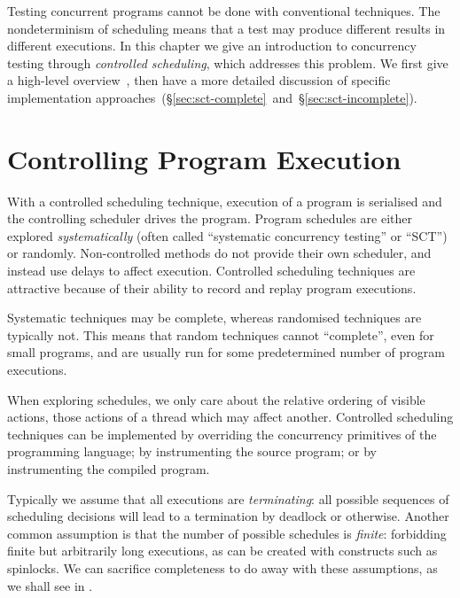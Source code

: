 Testing concurrent programs cannot be done with conventional techniques.  The
nondeterminism of scheduling means that a test may produce different results in
different executions.  In this chapter we give an introduction to concurrency
testing through \emph{controlled scheduling}, which addresses this problem.  We
first give a high-level overview~, then have a more
detailed discussion of specific implementation
approaches~(\S\ref{sec:sct-complete}~and~\S\ref{sec:sct-incomplete}).

\section{Controlling Program Execution}
\label{sec:sct-fundamentals}

With a controlled scheduling technique, execution of a program is serialised and
the controlling scheduler drives the program.  Program schedules are either
explored \emph{systematically}\cite{coons2013,musuvathi2008,musuvathi2007,flanagan2005}
(often called ``systematic concurrency testing'' or ``SCT'') or
randomly\cite{thomson2016,burckhardt2010}.  Non-controlled methods do not
provide their own scheduler, and instead use delays to affect
execution\cite{yu2012}.  Controlled scheduling techniques are attractive because
of their ability to record and replay program executions.

Systematic techniques may be complete, whereas randomised techniques are
typically not.  This means that random techniques cannot ``complete'', even for
small programs, and are usually run for some predetermined number of program
executions.

When exploring schedules, we only care about the relative ordering of visible
actions, those actions of a thread which may affect another.  Controlled
scheduling techniques can be implemented by overriding the concurrency
primitives of the programming language\cite{walker2015}; by instrumenting the
source program\cite{claessen2009}; or by instrumenting the compiled
program\cite{yu2012,musuvathi2006}.

Typically we assume that all executions are \emph{terminating}: all possible
sequences of scheduling decisions will lead to a termination by deadlock or
otherwise.  Another common assumption is that the number of possible schedules
is \emph{finite}: forbidding finite but arbitrarily long executions, as can be
created with constructs such as spinlocks.  We can sacrifice completeness to do
away with these assumptions, as we shall see in .

